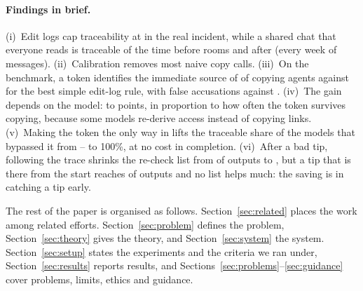 \paragraph{Findings in brief.}
(i)~Edit logs cap traceability at \bestTop{} in the real incident, while a shared chat that everyone reads is traceable \avPre{} of the time before rooms and \avPost{} after (every week of \avMessages{} messages). (ii)~Calibration removes most naive copy calls. (iii)~On the benchmark, a token identifies the immediate source of \benchTagsTop{} of copying agents against \benchEarliestTop{} for the best simple edit-log rule, with \benchTagsFA{} false accusations against \benchRuleFA{}. (iv)~The gain depends on the model: \liftMin{} to \liftMax{} points, in proportion to how often the token survives copying, because some models re-derive access instead of copying links. (v)~Making the token the only way in lifts the traceable share of the models that bypassed it from \gatedOpenLo{}--\gatedOpenHi{} to 100\%, at no cost in completion. (vi)~After a bad tip, following the trace shrinks the re-check list from \recheckAfter{} of outputs to \recheckTrace{}, but a tip that is there from the start reaches \earlyReach{} of outputs and no list helps much: the saving is in catching a tip early.

The rest of the paper is organised as follows. Section~\ref{sec:related} places the work among related efforts. Section~\ref{sec:problem} defines the problem, Section~\ref{sec:theory} gives the theory, and Section~\ref{sec:system} the system. Section~\ref{sec:setup} states the experiments and the criteria we ran under, Section~\ref{sec:results} reports results, and Sections~\ref{sec:problems}--\ref{sec:guidance} cover problems, limits, ethics and guidance.
